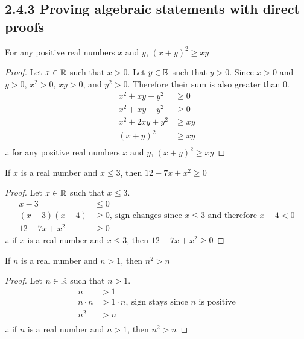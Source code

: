 \subsection*{2.4.3 Proving algebraic statements with direct proofs}
\begin{enumerate}
   For any positive real numbers $x$ and $y$, $(x+y)^2 \geq xy$
  \begin{proof}
    Let $x \in \mathbb{R}$ such that $x > 0$. Let $y \in \mathbb{R}$ such that $y > 0$.
    Since $x > 0$ and $y > 0$, $x^2 > 0$, $xy > 0$, and $y^2 > 0$. Therefore their sum is also greater than $0$.
    \begin{align*}
      x^2 + xy + y^2  & \geq 0  \\
      x^2 + xy + y^2  & \geq 0  \\
      x^2 + 2xy + y^2 & \geq xy \\
      (x+y)^2         & \geq xy \\
    \end{align*}
    $\therefore$ for any positive real numbers $x$ and $y$, $(x+y)^2 \geq xy$
  \end{proof}
   If $x$ is a real number and $x \leq 3$, then $12 - 7x + x^2 \geq 0$
  \begin{proof}
    Let $x \in \mathbb{R}$ such that $x \leq 3$.
    \begin{align*}
      x-3           & \leq 0                                                               \\
      (x-3)(x-4)    & \geq 0,~\text{sign changes since $x \leq 3$ and therefore $x-4 < 0$} \\
      12 - 7x + x^2 & \geq 0
    \end{align*}
    $\therefore$ if $x$ is a real number and $x \leq 3$, then $12 - 7x + x^2 \geq 0$
  \end{proof}
   If $n$ is a real number and $n > 1$, then $n^2 > n$
  \begin{proof}
    Let $n \in \mathbb{R}$ such that $n > 1$.
    \begin{align*}
      n         & > 1                                                  \\
      n \cdot n & > 1 \cdot n,~\text{sign stays since $n$ is positive} \\
      n^2       & > n                                                  \\
    \end{align*}
    $\therefore$ if $n$ is a real number and $n > 1$, then $n^2 > n$
  \end{proof}

\end{enumerate}
